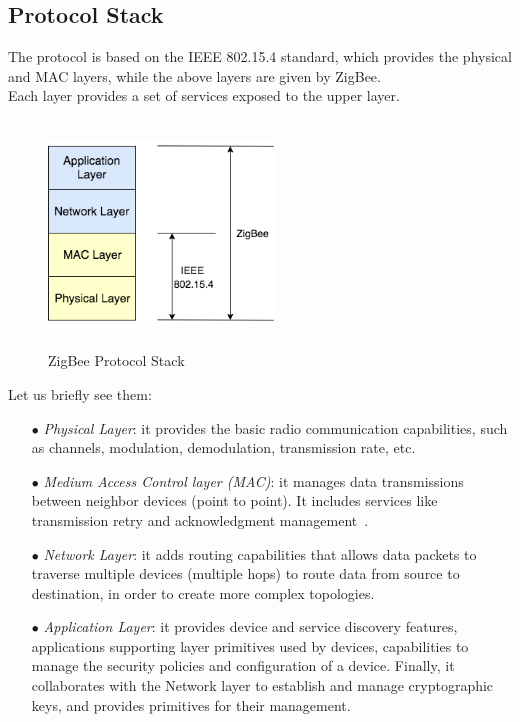 \documentclass[12pt]{report}
\begin{document}
{\clearpage
\subsection{Protocol Stack}
\bigskip

The protocol is based on the IEEE 802.15.4 standard, which provides the physical and MAC layers, while the above layers are given by ZigBee.\\
Each layer provides a set of services exposed to the upper layer.

\begin{figure}[H]
\includegraphics[width=6cm,height=6cm,keepaspectratio]{zigbee_stack}
\centering
\caption{ZigBee Protocol Stack}
\end{figure}

Let us briefly see them: 

\begin{itemize}
\setlength{\itemindent}{+4mm}
\item[$\bullet$] \emph{Physical Layer}: it provides the basic radio communication capabilities, such as channels, modulation, demodulation, transmission rate, etc.
\item[$\bullet$] \emph{Medium Access Control layer (MAC)}: it manages data transmissions between neighbor devices (point to point). 
It includes services like transmission retry and acknowledgment management~\cite{digi}.
\item[$\bullet$] \emph{Network Layer}: it adds routing capabilities that allows data packets to traverse multiple devices (multiple hops) to route data from source to destination, in order to create more complex topologies.
\item[$\bullet$] \emph{Application Layer}: it provides device and service discovery features, applications supporting layer primitives used by devices, capabilities to manage the security policies and configuration of a device. Finally, it collaborates with the Network layer to establish and manage cryptographic keys, and provides primitives for their management.


\end{itemize}}
\end{document}
